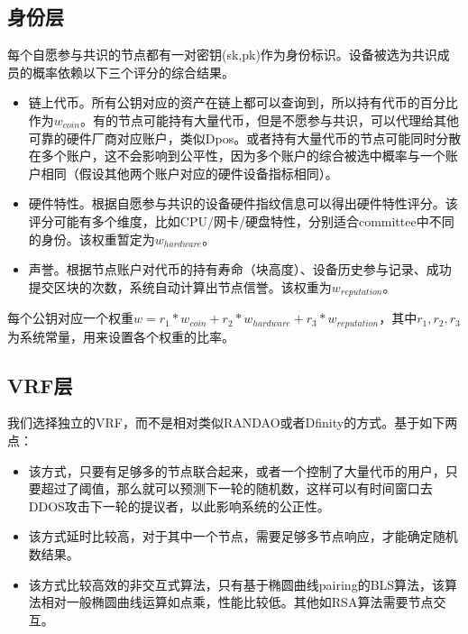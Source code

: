 \documentclass[12pt, UTF8]{article}
\begin{document}
\subsection{身份层}
每个自愿参与共识的节点都有一对密钥(sk,pk)作为身份标识。设备被选为共识成员的概率依赖以下三个评分的综合结果。
\begin{itemize}
\item 链上代币。所有公钥对应的资产在链上都可以查询到，所以持有代币的百分比作为$w_{coin}$。有的节点可能持有大量代币，但是不愿参与共识，可以代理给其他可靠的硬件厂商对应账户，类似Dpos。或者持有大量代币的节点可能同时分散在多个账户，这不会影响到公平性，因为多个账户的综合被选中概率与一个账户相同（假设其他两个账户对应的硬件设备指标相同）。
\item 硬件特性。根据自愿参与共识的设备硬件指纹信息可以得出硬件特性评分。该评分可能有多个维度，比如CPU/网卡/硬盘特性，分别适合committee中不同的身份。该权重暂定为$w_{hardware}$。
\item 声誉。根据节点账户对代币的持有寿命（块高度）、设备历史参与记录、成功提交区块的次数，系统自动计算出节点信誉。该权重为$w_{reputation}$。
\end{itemize}
每个公钥对应一个权重$w=r_1*w_{coin}+r_2*w_{hardware}+r_3*w_{reputation}$，其中$r_1,r_2,r_3$为系统常量，用来设置各个权重的比率。

\subsection{VRF层}
我们选择独立的VRF，而不是相对类似RANDAO或者Dfinity的方式。基于如下两点：
\begin{itemize}
\item 该方式，只要有足够多的节点联合起来，或者一个控制了大量代币的用户，只要超过了阈值，那么就可以预测下一轮的随机数，这样可以有时间窗口去DDOS攻击下一轮的提议者，以此影响系统的公正性。
\item 该方式延时比较高，对于其中一个节点，需要足够多节点响应，才能确定随机数结果。
\item 该方式比较高效的非交互式算法，只有基于椭圆曲线pairing的BLS算法，该算法相对一般椭圆曲线运算如点乘，性能比较低。其他如RSA算法需要节点交互。
\end{itemize}

\begin{comment}
本层需要初始化的种子seed，可以放在创世区块中。该种子没有特殊要求，可以是任意256bit字符串。VRF层每次都会根据上一轮的种子，生成下一轮的种子，并包含在下一轮的区块中。
假设上一轮block中的种子为seedr，每个可能选为committee的节点$(pk, sk)$，独立运行伪随机函数f，输出256bit，该输出归一化到[0,1)，小于节点自身权重w，则为被选中，可以广播消息。即
\begin{equation}
Th_{min}<f(sk,seed_r)/2^{256} <w
\end{equation}

这里thmin为系统参数，可以动态调整，为了提高效率，过滤掉小概率的用户。目的是为了结合w的分布，共同设置一个窗口，保证足够多的节点被选中。
\end{comment}
\end{document}
